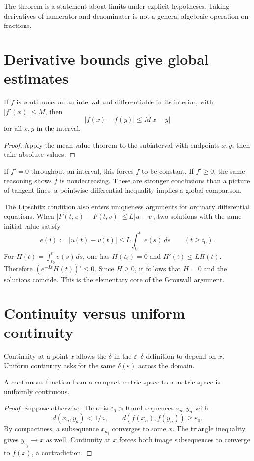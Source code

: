 The theorem is a statement about limits under explicit hypotheses. Taking derivatives of numerator and denominator is not a general algebraic operation on fractions.

\section{Derivative bounds give global estimates}

\begin{proposition}
If \(f\) is continuous on an interval and differentiable in its interior, with \(|f'(x)|\le M\), then
\[
  |f(x)-f(y)|\le M|x-y|
\]
for all \(x,y\) in the interval.
\end{proposition}
\begin{proof}
Apply the mean value theorem to the subinterval with endpoints \(x,y\), then take absolute values.
\end{proof}

If \(f'=0\) throughout an interval, this forces \(f\) to be constant. If \(f'\ge0\), the same reasoning shows \(f\) is nondecreasing. These are stronger conclusions than a picture of tangent lines: a pointwise differential inequality implies a global comparison.

The Lipschitz condition also enters uniqueness arguments for ordinary differential equations. When \(|F(t,u)-F(t,v)|\le L|u-v|\), two solutions with the same initial value satisfy
\[
  e(t):=|u(t)-v(t)|\le L\int_{t_0}^{t}e(s)\,ds
  \qquad (t\ge t_0).
\]
For \(H(t)=\int_{t_0}^t e(s)\,ds\), one has \(H(t_0)=0\) and \(H'(t)\le LH(t)\). Therefore
\((e^{-Lt}H(t))'\le0\). Since \(H\ge0\), it follows that \(H=0\) and the solutions coincide. This is the elementary core of the Gronwall argument.

\section{Continuity versus uniform continuity}

Continuity at a point \(x\) allows the \(\delta\) in the \(\varepsilon\)--\(\delta\) definition to depend on \(x\). Uniform continuity asks for the same \(\delta(\varepsilon)\) across the domain.

\begin{theorem}
A continuous function from a compact metric space to a metric space is uniformly continuous.
\end{theorem}
\begin{proof}
Suppose otherwise. There is \(\varepsilon_0>0\) and sequences \(x_n,y_n\) with
\[
  d(x_n,y_n)<1/n,\qquad
  d(f(x_n),f(y_n))\ge\varepsilon_0.
\]
By compactness, a subsequence \(x_{n_j}\) converges to some \(x\). The triangle inequality gives \(y_{n_j}\to x\) as well. Continuity at \(x\) forces both image subsequences to converge to \(f(x)\), a contradiction.
\end{proof}

